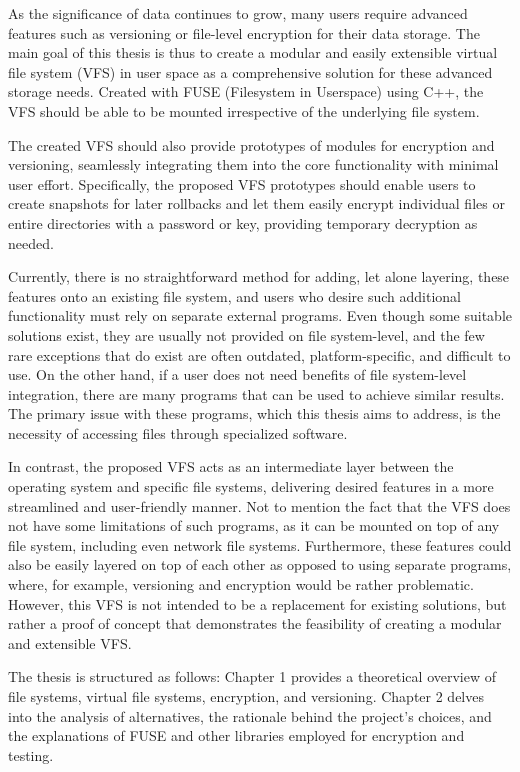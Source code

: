 
As the significance of data continues to grow, many users require advanced features such as versioning or file-level encryption for their data storage.
The main goal of this thesis is thus to create a modular and easily extensible virtual file system (VFS) in user space as a comprehensive solution for these advanced storage needs.
Created with FUSE (Filesystem in Userspace) using C++, the VFS should be able to be mounted irrespective of the underlying file system.

The created VFS should also provide prototypes of modules for encryption and versioning, seamlessly integrating them into the core functionality with minimal user effort.
Specifically, the proposed VFS prototypes should enable users to create snapshots for later rollbacks and let them easily encrypt individual files or entire directories with a password or key, providing temporary decryption as needed.

Currently, there is no straightforward method for adding, let alone layering, these features onto an existing file system, and users who desire such additional functionality must rely on separate external programs.
Even though some suitable solutions exist, they are usually not provided on file system-level, and the few rare exceptions that do exist are often outdated, platform-specific, and difficult to use.
On the other hand, if a user does not need benefits of file system-level integration, there are many programs that can be used to achieve similar results.
The primary issue with these programs, which this thesis aims to address, is the necessity of accessing files through specialized software.

In contrast, the proposed VFS acts as an intermediate layer between the operating system and specific file systems, delivering desired features in a more streamlined and user-friendly manner.
Not to mention the fact that the VFS does not have some limitations of such programs, as it can be mounted on top of any file system, including even network file systems.
Furthermore, these features could also be easily layered on top of each other as opposed to using separate programs, where, for example, versioning and encryption would be rather problematic.
However, this VFS is not intended to be a replacement for existing solutions, but rather a proof of concept that demonstrates the feasibility of creating a modular and extensible VFS.

The thesis is structured as follows: Chapter 1 provides a theoretical overview of file systems, virtual file systems, encryption, and versioning.
Chapter 2 delves into the analysis of alternatives, the rationale behind the project's choices, and the explanations of FUSE and other libraries employed for encryption and testing.

